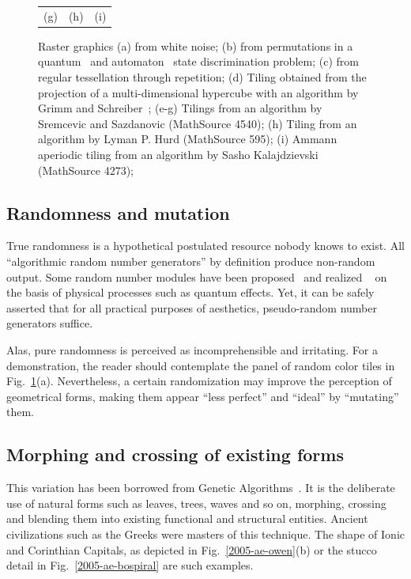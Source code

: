 \documentclass[%
 reprint,
 showpacs,
 showkeys,
 amsmath,
 amssymb,
 aps,
 pra,
 longbibliography,
 floatfix,
 ]{revtex4-1}
\begin{document}
\begin{figure}
\begin{center}
\begin{tabular}{ccc}
\\
(g)&(h)&(i)\\
\end{tabular}
\end{center}
   \caption{Raster graphics
(a) from white noise;
(b) from permutations in a quantum~\cite{DonSvo01}
and automaton~\cite{svozil-2004-kyoto,svozil-2003-garda} state discrimination problem;
(c) from regular tessellation through repetition;
(d) Tiling obtained from the projection of a multi-dimensional hypercube with
an algorithm by  Grimm and Schreiber~\cite{grimm-schr-02};
(e-g) Tilings from
an algorithm by  Sremcevic and Sazdanovic (MathSource 4540);
(h) Tiling from
an algorithm by Lyman P. Hurd (MathSource 595);
(i) Ammann aperiodic tiling from
an algorithm by Sasho Kalajdzievski (MathSource 4273);
}
   \label{2005-ae-raster-wn}
 \end{figure}


\subsection{Randomness and mutation}

True randomness is a hypothetical postulated resource nobody knows to exist.
All ``algorithmic random number generators'' by definition produce
non-random output. Some random number modules have been proposed~\cite{svozil-qct}
and realized ~\cite{zeilinger:qct}
on the basis of physical processes such as quantum effects.
Yet, it can be safely asserted that for all practical purposes of
aesthetics, pseudo-random number generators suffice.

Alas, pure randomness is perceived as incomprehensible and irritating. For a
demonstration, the reader should contemplate the panel of random color
tiles in Fig.~\ref{2005-ae-raster-wn}(a).
Nevertheless, a certain randomization may improve the
perception of geometrical forms, making them appear ``less perfect'' and
``ideal'' by ``mutating'' them.


\subsection{Morphing and crossing of existing forms}

This variation has been borrowed from Genetic Algorithms~\cite{goldberg:89,holland:92a,mitchell}.
It is
the deliberate use of natural forms such as leaves, trees, waves and so on,
morphing, crossing and blending them into existing functional and structural
entities.
Ancient civilizations such as the Greeks were masters of this technique.
The shape of Ionic and Corinthian Capitals,
as depicted in Fig.~\ref{2005-ae-owen}(b)
or the stucco detail in  Fig.~\ref{2005-ae-bospiral}
are such examples.
\end{document}

